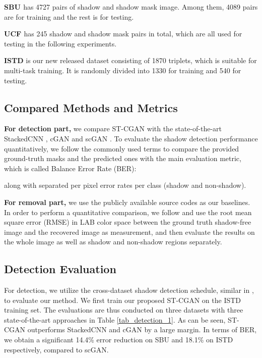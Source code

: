 \documentclass[10pt,twocolumn,letterpaper]{article}
\begin{document}
\noindent \textbf{SBU \cite{vicente2016large}} has 4727 pairs of shadow and shadow mask image. Among them, 4089 pairs are for training and the rest is for testing.

\noindent \textbf{UCF \cite{zhu2010learning}} has 245 shadow and shadow mask pairs in total, which are all used for testing in the following experiments.

\noindent \textbf{ISTD} is our new released dataset consisting of 1870 triplets, which is suitable for multi-task training. It is randomly divided into 1330 for training and 540 for testing.

\vspace{-5pt}
\subsection{Compared Methods and Metrics}
\noindent \textbf{For detection part,} we compare ST-CGAN with the state-of-the-art StackedCNN \cite{vicente2016large}, cGAN \cite{nguyen2017shadow} and scGAN \cite{nguyen2017shadow}. To evaluate the shadow detection performance quantitatively, we follow the commonly used terms \cite{nguyen2017shadow} to compare the provided ground-truth masks and the predicted ones with the main evaluation metric, which is called Balance Error Rate (BER):

along with separated per pixel error rates per class (shadow and non-shadow).

\noindent \textbf{For removal part,} we use the publicly available source codes \cite{guo2013paired,yang2012shadow,gong2014interactive} as our baselines. In order to perform a quantitative comparison, we follow \cite{guo2013paired,qudeshadownet} and use the root mean square error (RMSE) in LAB color space between the ground truth shadow-free image and the recovered image as measurement, and then evaluate the results on the whole image as well as shadow and non-shadow regions separately.



\subsection{Detection Evaluation}
For detection, we utilize the cross-dataset shadow detection schedule, similar in \cite{nguyen2017shadow}, to evaluate our method. We first train our proposed ST-CGAN on the ISTD training set. The evaluations are thus conducted on three datasets with three state-of-the-art approaches in Table \ref{tab_detection_1}. As can be seen, ST-CGAN outperforms StackedCNN and cGAN by a large margin. In terms of BER, we obtain a significant 14.4\% error reduction on SBU and 18.1\% on ISTD respectively, compared to scGAN. 
\end{document}
